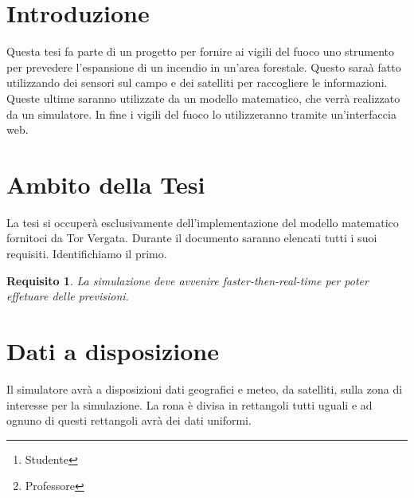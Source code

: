 \documentclass[draft]{article}
\title{\mytitle}
\date{2021}
\author{Diego Bellani\thanks{Studente}\and Enrico Tronci\thanks{Professore}}
\newtheorem{requirement}{Requisito}
\begin{document}
\begin{titlepage}
	\maketitle

	\begin{abstract}
	Questo documento  contiene le specifiche dei
	requisiti per la tesi sulla simulazione \textit{multi-core} di incendi.
	\end{abstract}

	\tableofcontents
\end{titlepage}

\section{Introduzione}

Questa tesi fa parte di un progetto per fornire ai vigili del fuoco uno
strumento per prevedere l'espansione di un incendio in un'area forestale. Questo
saraà fatto utilizzando dei sensori sul campo e dei satelliti per raccogliere le
informazioni. Queste ultime saranno utilizzate da un modello matematico, che
verrà realizzato da un simulatore. In fine i vigili del fuoco lo utilizzeranno
tramite un'interfaccia web.

\section{Ambito della Tesi}

La tesi si occuperà esclusivamente dell'implementazione del modello matematico
fornitoci da Tor Vergata. Durante il documento saranno elencati tutti i suoi
requisiti. Identifichiamo il primo.

\begin{requirement}
La simulazione deve avvenire \textit{faster-then-real-time} per poter effetuare
delle previsioni.
\end{requirement}

\section{Dati a disposizione}

Il simulatore avrà a disposizioni dati geografici e meteo, da satelliti, sulla
zona di interesse per la simulazione. La rona è divisa in rettangoli tutti
uguali e ad ognuno di questi rettangoli avrà dei dati uniformi.
\end{document}
